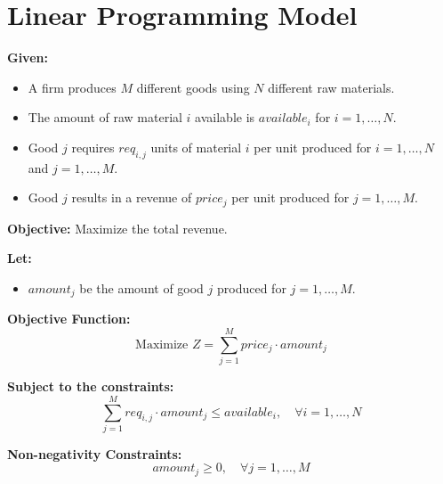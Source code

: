 \documentclass{article}
\begin{document}
\section*{Linear Programming Model}

\textbf{Given:}
\begin{itemize}
    \item A firm produces $M$ different goods using $N$ different raw materials.
    \item The amount of raw material $i$ available is $available_i$ for $i = 1, \ldots, N$.
    \item Good $j$ requires $req_{i,j}$ units of material $i$ per unit produced for $i = 1, \ldots, N$ and $j = 1, \ldots, M$.
    \item Good $j$ results in a revenue of $price_j$ per unit produced for $j = 1, \ldots, M$.
\end{itemize}

\textbf{Objective:} Maximize the total revenue.

\textbf{Let:} 
\begin{itemize}
    \item $amount_j$ be the amount of good $j$ produced for $j = 1, \ldots, M$.
\end{itemize}

\textbf{Objective Function:}
\[
\text{Maximize } Z = \sum_{j=1}^{M} price_j \cdot amount_j
\]

\textbf{Subject to the constraints:}
\[
\sum_{j=1}^{M} req_{i,j} \cdot amount_j \leq available_i, \quad \forall i = 1, \ldots, N
\]

\textbf{Non-negativity Constraints:}
\[
amount_j \geq 0, \quad \forall j = 1, \ldots, M
\]
\end{document}
